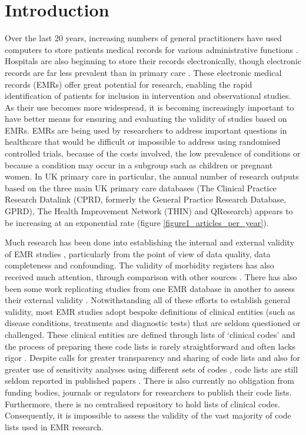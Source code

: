 \documentclass[10pt]{article}
\begin{document}
\section*{Introduction}

Over the last 20 years, increasing numbers of general practitioners have used computers to store patients medical records for various administrative functions \cite{Purves1996}. Hospitals are also beginning to store their records electronically, though electronic records are far less prevalent than in primary care \cite{Ashish2009}. These electronic medical records (EMRs) offer great potential for research, enabling the rapid identification of patients for inclusion in intervention and observational studies. As their use becomes more widespread, it is becoming increasingly important to have better means for ensuring and evaluating the validity of studies based on EMRs. EMRs are being used by researchers to address important questions in healthcare that would be difficult or impossible to address using randomised controlled trials, because of the costs involved, the low prevalence of conditions or because a condition may occur in a subgroup such as children or pregnant women. In UK primary care in particular, the annual number of research outputs based on the three main UK primary care databases (The Clinical Practice Research Datalink (CPRD, formerly the General Practice Research Database, GPRD), The Health Improvement Network (THIN) and QResearch) appears to be increasing at an exponential rate (figure \ref{figure1_articles_per_year}). 


Much research has been done into establishing the internal and external validity of EMR studies \cite{Herrett2010}, particularly from the point of view of data quality, data completeness and confounding.  The validity of morbidity registers has also received much attention, through comparison with other sources \cite{Jordan2004}. There has also been some work replicating studies from one EMR database in another to assess their external validity \cite{Hippisley-Cox2008, Vinogradova2013, Reeves2014}.  Notwithstanding all of these efforts to establish general validity, most EMR studies adopt bespoke definitions of clinical entities (such as disease conditions, treatments and diagnostic tests) that are seldom questioned or challenged.  These clinical entities are defined through lists of `clinical codes' and the process of preparing these code lists is rarely straightforward and often lacks rigor \cite{Dave2009}.  Despite calls for greater transparency and sharing of code lists and also for greater use of sensitivity analyses using different sets of codes \cite{Gulliford2009, Bhattarai2012}, code lists are still seldom reported in published papers \cite{Herrett2010}.  There is also currently no obligation from funding bodies, journals or regulators for researchers to publish their code lists.  Furthermore, there is no centralised repository to hold lists of clinical codes. Consequently, it is impossible to assess the validity of the vast majority of code lists used in EMR research. 
\end{document}
